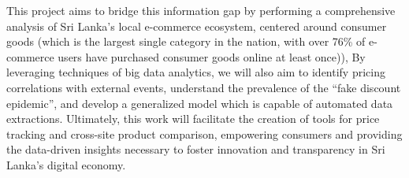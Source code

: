 This project aims to bridge this information gap by performing a comprehensive analysis of Sri Lanka’s local e-commerce ecosystem, centered around consumer goods (which is the largest single category in the nation, with over 76\% of e-commerce users have purchased consumer goods online at least once\cite{slasscom2023daraz})),  By leveraging techniques of big data analytics, we will also aim to identify pricing correlations with external events, understand the prevalence of the “fake discount epidemic”, and develop a generalized model which is capable of automated data extractions.
Ultimately, this work will facilitate the creation of tools for price tracking and cross-site product comparison, empowering consumers and providing the data-driven insights necessary to foster innovation and transparency in Sri Lanka’s digital economy.
